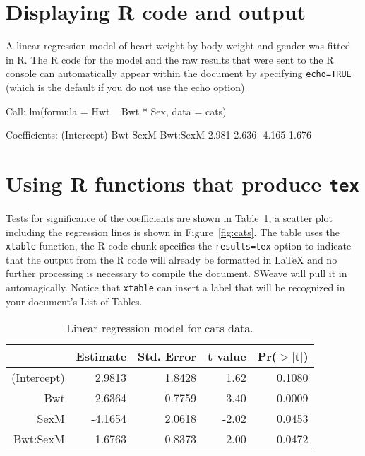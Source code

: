 \section{Displaying R code and output}
A linear regression model of heart weight by body weight and gender was
fitted in R.  The R code for the model and the raw results that were sent to the R console can automatically appear within the document by specifying \texttt{echo=TRUE} (which is the default if you do not use the echo option)

\begin{Schunk}
\begin{Soutput}
Call:
lm(formula = Hwt ~ Bwt * Sex, data = cats)

Coefficients:
(Intercept)          Bwt         SexM     Bwt:SexM  
      2.981        2.636       -4.165        1.676  
\end{Soutput}
\end{Schunk}
\section{Using R functions that produce \texttt{tex}}
Tests for significance of the coefficients are shown in
Table~\ref{tab:coef}, a scatter plot including the regression lines is
shown in Figure~\ref{fig:cats}.  The table uses the \texttt{xtable} function, the R code chunk specifies the \texttt{results=tex} option to indicate that the output from the R code will already be formatted in \LaTeX{} and no further processing is necessary to compile the document.  SWeave will pull it in automagically.   Notice that \texttt{xtable} can insert a label that will be recognized in your document's List of Tables. 

\begin{table}[ht]
\begin{center}
\begin{tabular}{rrrrr}
  \hline
 & Estimate & Std. Error & t value & Pr($>$$|$t$|$) \\ 
  \hline
(Intercept) & 2.9813 & 1.8428 & 1.62 & 0.1080 \\ 
  Bwt & 2.6364 & 0.7759 & 3.40 & 0.0009 \\ 
  SexM & -4.1654 & 2.0618 & -2.02 & 0.0453 \\ 
  Bwt:SexM & 1.6763 & 0.8373 & 2.00 & 0.0472 \\ 
   \hline
\end{tabular}
\caption{Linear regression model for cats data.}
\label{tab:coef}
\end{center}
\end{table}
